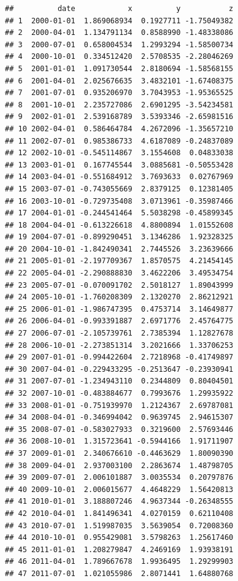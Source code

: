 \documentclass[
]{article}
\begin{document}
\begin{verbatim}
##          date            x          y           z
## 1  2000-01-01  1.869068934  0.1927711 -1.75049382
## 2  2000-04-01  1.134791134  0.8588990 -1.48338086
## 3  2000-07-01  0.658004534  1.2993294 -1.58500734
## 4  2000-10-01  0.334512420  2.5708535 -2.28046269
## 5  2001-01-01  1.091730544  2.8180694 -1.58568155
## 6  2001-04-01  2.025676635  3.4832101 -1.67408375
## 7  2001-07-01  0.935206970  3.7043953 -1.95365525
## 8  2001-10-01  2.235727086  2.6901295 -3.54234581
## 9  2002-01-01  2.539168789  3.5393346 -2.65981516
## 10 2002-04-01  0.586464784  4.2672096 -1.35657210
## 11 2002-07-01  0.985386733  4.6187089 -0.24837089
## 12 2002-10-01 -0.545114867  3.1554608  0.04833038
## 13 2003-01-01  0.167745544  3.0885681 -0.50553428
## 14 2003-04-01 -0.551684912  3.7693633  0.02767969
## 15 2003-07-01 -0.743055669  2.8379125  0.12381405
## 16 2003-10-01 -0.729735408  3.0713961 -0.35987466
## 17 2004-01-01 -0.244541464  5.5038298 -0.45899345
## 18 2004-04-01 -0.613226618  4.8800894  1.01552608
## 19 2004-07-01 -0.899290451  3.1346286  1.92328325
## 20 2004-10-01 -1.842490341  2.7445526  3.23639666
## 21 2005-01-01 -2.197709367  1.8570575  4.21454145
## 22 2005-04-01 -2.290888830  3.4622206  3.49534754
## 23 2005-07-01 -0.070091702  2.5018127  1.89043999
## 24 2005-10-01 -1.760208309  2.1320270  2.86212921
## 25 2006-01-01 -1.986747395  0.4753714  3.14649877
## 26 2006-04-01 -0.993391887  2.6971776  2.45764775
## 27 2006-07-01 -2.105739761  2.7385394  1.12827678
## 28 2006-10-01 -2.273851314  3.2021666  1.33706253
## 29 2007-01-01 -0.994422604  2.7218968 -0.41749897
## 30 2007-04-01 -0.229433295 -0.2513647 -0.23930941
## 31 2007-07-01 -1.234943110  0.2344809  0.80404501
## 32 2007-10-01 -0.483884677  0.7993676  1.29935922
## 33 2008-01-01 -0.751939970  1.2124367  2.69787081
## 34 2008-04-01 -0.346994042  0.9639745  2.94615307
## 35 2008-07-01 -0.583027933  0.3219600  2.57693446
## 36 2008-10-01  1.315723641 -0.5944166  1.91711907
## 37 2009-01-01  2.340676610 -0.4463629  1.80090390
## 38 2009-04-01  2.937003100  2.2863674  1.48798705
## 39 2009-07-01  2.006101887  3.0035534  0.20797876
## 40 2009-10-01  2.006015677  4.4648229  1.56420813
## 41 2010-01-01  3.188807246  4.9637344 -0.26348555
## 42 2010-04-01  1.841496341  4.0270159  0.62110408
## 43 2010-07-01  1.519987035  3.5639054  0.72008360
## 44 2010-10-01  0.955429081  3.5798263  1.25617460
## 45 2011-01-01  1.208279847  4.2469169  1.93938191
## 46 2011-04-01  1.789667678  1.9936495  1.29299903
## 47 2011-07-01  1.021055986  2.8071441  1.64880768

\end{verbatim}
\end{document}
